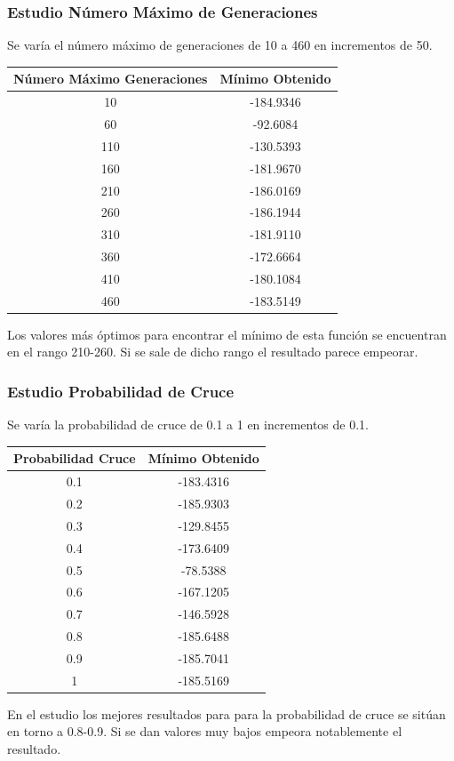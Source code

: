 \documentclass[12pt]{article}
\begin{document}
\subsubsection*{Estudio Número Máximo de Generaciones}
	Se varía el número máximo de generaciones de 10 a 460 en incrementos de 50.
\begin{table}[H]
\begin{center}
\begin{tabular}{|cc|} \hline
Número Máximo Generaciones & Mínimo Obtenido \\  \hline
10  & -184.9346 \\ 
60  & -92.6084 \\ 
110 & -130.5393 \\
160 & -181.9670 \\
210 & -186.0169 \\
260 & -186.1944 \\
310 & -181.9110 \\
360 & -172.6664 \\ 
410 & -180.1084 \\
460 & -183.5149 \\  \hline
\end{tabular}
\end{center}
\end{table}
	Los valores más óptimos para encontrar el mínimo de esta función se encuentran en el rango 210-260. Si se sale de dicho rango el resultado parece empeorar.

\subsubsection*{Estudio Probabilidad de Cruce}
	Se varía la probabilidad de cruce de 0.1 a 1 en incrementos de 0.1.
\begin{table}[H]
\begin{center}
\begin{tabular}{|cc|} \hline
Probabilidad Cruce & Mínimo Obtenido \\  \hline
0.1 & -183.4316 \\ 
0.2 & -185.9303 \\ 
0.3 & -129.8455 \\
0.4 & -173.6409 \\
0.5 & -78.5388 \\
0.6 & -167.1205 \\
0.7 & -146.5928 \\
0.8 & -185.6488 \\ 
0.9 & -185.7041 \\
1   & -185.5169 \\  \hline
\end{tabular}
\end{center} 
\end{table}
	En el estudio los mejores resultados para para la probabilidad de cruce se sitúan en torno a 0.8-0.9. Si se dan valores muy bajos empeora notablemente el resultado.
\end{document}
